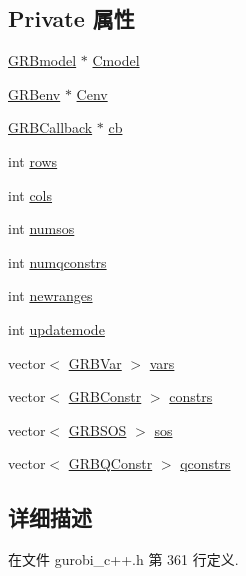 \subsection*{Private 属性}
\begin{DoxyCompactItemize}
\item 
\hyperlink{gurobi__c_8h_a865e461c79c88bc5c0d5f56087ae4876}{G\+R\+Bmodel} $\ast$ \hyperlink{classGRBModel_a8eedf4d4f2c9cd3159bd965d4595191f}{Cmodel}
\item 
\hyperlink{gurobi__c_8h_a2963ba0c46b86ac4680fb3bb4ca8b2f3}{G\+R\+Benv} $\ast$ \hyperlink{classGRBModel_ac46ee318ff2a26ddae94dd45480ae1dc}{Cenv}
\item 
\hyperlink{classGRBCallback}{G\+R\+B\+Callback} $\ast$ \hyperlink{classGRBModel_aa23c57adb09b4579dd70d32e517efe21}{cb}
\item 
int \hyperlink{classGRBModel_ada5c8e80ac12d437788ccad6c1f42b24}{rows}
\item 
int \hyperlink{classGRBModel_a7451154c68d35f13d44232c253d52fa8}{cols}
\item 
int \hyperlink{classGRBModel_a0743eafebda885b7df2c2b5923f6b8b1}{numsos}
\item 
int \hyperlink{classGRBModel_aad59ddf2475017a4828a22e08e52b59a}{numqconstrs}
\item 
int \hyperlink{classGRBModel_a358db0bf3a8f9bebcadc9403af27551f}{newranges}
\item 
int \hyperlink{classGRBModel_a717756c5b80328a48913e94986ba65fa}{updatemode}
\item 
vector$<$ \hyperlink{classGRBVar}{G\+R\+B\+Var} $>$ \hyperlink{classGRBModel_a96d3ba518278642c7b13b74ad9bc7f7e}{vars}
\item 
vector$<$ \hyperlink{classGRBConstr}{G\+R\+B\+Constr} $>$ \hyperlink{classGRBModel_a755e1d5f050c0244720ccca9610a1e02}{constrs}
\item 
vector$<$ \hyperlink{classGRBSOS}{G\+R\+B\+S\+OS} $>$ \hyperlink{classGRBModel_a61a1fbf3b90e08e1c149b2081ea9b847}{sos}
\item 
vector$<$ \hyperlink{classGRBQConstr}{G\+R\+B\+Q\+Constr} $>$ \hyperlink{classGRBModel_ab999e528d40409141a1db990e6277806}{qconstrs}
\end{DoxyCompactItemize}


\subsection{详细描述}


在文件 gurobi\+\_\+c++.\+h 第 361 行定义.



